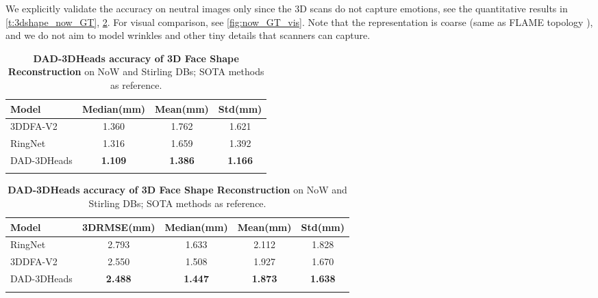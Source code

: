 \documentclass[10pt,twocolumn,letterpaper]{article}
\begin{document}
We explicitly validate the accuracy on neutral images only since the 3D scans do not capture emotions, see the quantitative results in \cref{t:3dshape_now_GT}, \cref{t:3dshape_feng_GT}. For visual comparison, see \cref{fig:now_GT_vis}. Note that the representation is coarse (same as FLAME topology \cite{FLAME}), and we do not aim to model wrinkles and other tiny details that scanners can capture.
\begin{table}[t]
\footnotesize

\setlength{\tabcolsep}{3pt}
	\begin{subtable}[t]{.99\linewidth}\centering
		{



\centering
\tiny
\caption{\textbf{NoW\cite{RingNet} Dataset,} "multiview\_neutral" subset.}
\begin{adjustbox}{width=0.99\textwidth}
\begin{tabular}{@{}lccc@{}}

\hline \textbf{Model} & \textbf{Median(mm)} & \textbf{Mean(mm)} & \textbf{Std(mm)}\\\hline 3DDFA-V2 \cite{3ddfa_cleardusk, guo2020towards} & 1.360 & 1.762 & 1.621                          \\
    RingNet \cite{RingNet} & 1.316 & 1.659 & 1.392\\
    DAD-3DHeads & \textbf{1.109} & \textbf{1.386} & \textbf{1.166}                          \\\hline
\noalign{\smallskip}
\end{tabular}
\end{adjustbox}

\label{t:3dshape_now_GT} }	
	\end{subtable}
	\hfill
	\begin{subtable}[t]{.99\linewidth}\centering
		{



\centering
\tiny
\caption{\textbf{Stirling\cite{Stirling} Database,} "Neutral expression, four views" subset.}
\begin{adjustbox}{width=0.99\textwidth}
\begin{tabular}{@{}lcccc@{}}

\hline \textbf{Model} & \textbf{3DRMSE(mm)} & \textbf{Median(mm)} & \textbf{Mean(mm)} & \textbf{Std(mm)}\\\hline RingNet \cite{RingNet} & 2.793 & 1.633 & 2.112 & 1.828 \\
    3DDFA-V2 \cite{3ddfa_cleardusk, guo2020towards} & 2.550 & 1.508 & 1.927 & 1.670         \\        DAD-3DHeads & \textbf{2.488} & \textbf{1.447} & \textbf{1.873} & \textbf{1.638}                          \\\hline
\noalign{\smallskip}
\end{tabular}
\end{adjustbox}

\label{t:3dshape_feng_GT}

 }	
	\end{subtable}


\caption{\textbf{DAD-3DHeads accuracy of 3D Face Shape Reconstruction} on NoW and Stirling DBs; SOTA methods as reference.}
\end{table}
 
\end{document}
